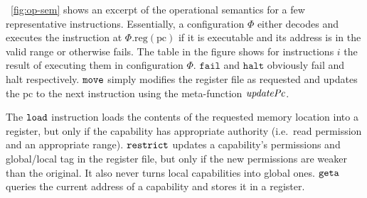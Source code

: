 \documentclass[compsoc,conference,letterpaper,fleqn]{IEEEtran}
\newcommand{\update}[2]{[#1 \mapsto #2]}
\newcommand{\sem}[1]{\left\llbracket #1 \right\rrbracket}
\newcommand{\var}[1]{\mathit{#1}}
\newcommand{\lv}{\var{r}}
\newcommand{\gl}{\var{g}}
\newcommand{\pcreg}{\mathrm{pc}}
\newcommand{\addr}{\var{a}}
\newcommand{\start}{\var{b}}
\newcommand{\addrend}{\var{e}}
\newcommand{\perm}{\var{perm}}
\newcommand{\permp}{\var{permPair}}
\newcommand{\stdcap}[1][(\perm,\gl)]{\left(#1,\start,\addrend,\addr \right)}
\newcommand{\plainproj}[1]{\mathrm{#1}}
\newcommand{\memreg}[1][\Phi]{#1.\plainproj{reg}}
\newcommand{\updateHeap}[3][\Phi]{#1\update{\plainproj{mem}.#2}{#3}}
\newcommand{\updateReg}[3][\Phi]{#1\update{\plainproj{reg}.#2}{#3}}
\newcommand{\plainfun}[2]{
  \ifthenelse{\equal{#2}{}}
  {\mathit{#1}}
  {\mathit{#1}(#2)}
}
\newcommand{\decodePermPair}{\plainfun{decodePermPair}}
\newcommand{\updatePcPerm}[1]{\plainfun{updatePcPerm}{#1}}
\newcommand{\stdUpdatePc}[1]{\plainfun{updatePc}{#1}}
\newcommand{\refreg}[1]{#1}
\newcommand{\refheap}[1]{#1}
\newcommand{\zinstr}[1]{\mathtt{#1}}
\newcommand{\fail}{\zinstr{fail}}
\newcommand{\halt}{\zinstr{halt}}
\newcommand{\oneinstr}[2]{
  \ifthenelse{\equal{#2}{}}
  {\zinstr{#1}}
  {\zinstr{#1} \; #2}
}
\newcommand{\jmp}[1]{\oneinstr{jmp}{#1}}
\newcommand{\twoinstr}[3]{
  \ifthenelse{\equal{#2#3}{}}
  {\zinstr{#1}}
  {\zinstr{#1} \; #2 \; #3}
}
\newcommand{\restricttwo}[2]{\twoinstr{restrict}{#1}{#2}}
\newcommand{\geta}[2]{\twoinstr{geta}{#1}{#2}}
\newcommand{\move}[2]{\twoinstr{move}{#1}{#2}}
\newcommand{\store}[2]{\twoinstr{store}{#1}{#2}}
\newcommand{\load}[2]{\twoinstr{load}{#1}{#2}}
\newcommand{\plainperm}[1]{\mathrm{#1}}
\newcommand{\readwrite}{\plainperm{rw}}
\newcommand{\rwx}{\plainperm{rwx}}
\newcommand{\readwritel}{\plainperm{rwl}}
\newcommand{\rwlx}{\plainperm{rwlx}}
\newcommand{\local}{\plainperm{local}}
\begin{document}

\figurename~\ref{fig:op-sem} shows an excerpt of the operational semantics for a
few representative instructions. Essentially, a configuration $\Phi$ either
decodes and executes the instruction at $\memreg(\pcreg)$ if it is executable
and its address is in the valid range or otherwise fails. The table in the
figure shows for instructions $i$ the result of executing them in configuration
$\Phi$. $\fail$ and $\halt$ obviously fail and halt respectively. $\move{}{}$
simply modifies the register file as requested and updates the $\pcreg$ to the
next instruction using the meta-function $\stdUpdatePc{}$.

The $\load{}{}$ instruction loads the contents of the requested memory location
into a register, but only if the capability has appropriate authority (i.e.\
read permission and an appropriate range). $\restricttwo{}{}$ updates a
capability's permissions and global/local tag in the register file, but only if
the new permissions are weaker than the original. It also never turns local
capabilities into global ones. $\geta{}{}$ queries the current address of a
capability and stores it in a register.
\end{document}

